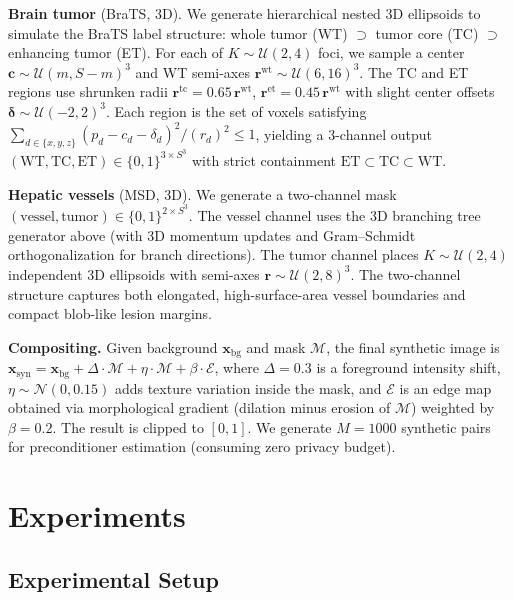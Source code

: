 \documentclass[runningheads]{llncs}
\newcommand{\bx}{\mathbf{x}}
\begin{document}
\textbf{Brain tumor} (BraTS, 3D). We generate hierarchical nested 3D ellipsoids to simulate the BraTS label structure: whole tumor (WT) $\supset$ tumor core (TC) $\supset$ enhancing tumor (ET). For each of $K{\sim}\mathcal{U}(2,4)$ foci, we sample a center $\mathbf{c}{\sim}\mathcal{U}(m,S{-}m)^3$ and WT semi-axes $\mathbf{r}^{\text{wt}}{\sim}\mathcal{U}(6,16)^3$. The TC and ET regions use shrunken radii $\mathbf{r}^{\text{tc}}{=}0.65\,\mathbf{r}^{\text{wt}}$, $\mathbf{r}^{\text{et}}{=}0.45\,\mathbf{r}^{\text{wt}}$ with slight center offsets $\boldsymbol{\delta}{\sim}\mathcal{U}(-2,2)^3$. Each region is the set of voxels satisfying
$\sum_{d\in\{x,y,z\}}(p_d{-}c_d{-}\delta_d)^2/(r_d)^2 \leq 1$,
yielding a 3-channel output $(\text{WT},\text{TC},\text{ET})\in\{0,1\}^{3\times S^3}$ with strict containment $\text{ET}\subset\text{TC}\subset\text{WT}$.

\textbf{Hepatic vessels} (MSD, 3D). We generate a two-channel mask $(\text{vessel},\text{tumor})\in\{0,1\}^{2\times S^3}$. The vessel channel uses the 3D branching tree generator above (with 3D momentum updates and Gram--Schmidt orthogonalization for branch directions). The tumor channel places $K{\sim}\mathcal{U}(2,4)$ independent 3D ellipsoids with semi-axes $\mathbf{r}{\sim}\mathcal{U}(2,8)^3$. The two-channel structure captures both elongated, high-surface-area vessel boundaries and compact blob-like lesion margins.

\textbf{Compositing.}
Given background $\bx_{\text{bg}}$ and mask $\mathcal{M}$, the final synthetic image is $\bx_{\text{syn}}=\bx_{\text{bg}}+\Delta\!\cdot\!\mathcal{M}+\eta\!\cdot\!\mathcal{M}+\beta\!\cdot\!\mathcal{E}$, where $\Delta{=}0.3$ is a foreground intensity shift, $\eta{\sim}\mathcal{N}(0,0.15)$ adds texture variation inside the mask, and $\mathcal{E}$ is an edge map obtained via morphological gradient (dilation minus erosion of $\mathcal{M}$) weighted by $\beta{=}0.2$. The result is clipped to $[0,1]$. We generate $M{=}1000$ synthetic pairs for preconditioner estimation (consuming zero privacy budget).

\section{Experiments}
\label{sec:experiments}

\subsection{Experimental Setup}
\label{subsec:setup}
\end{document}
